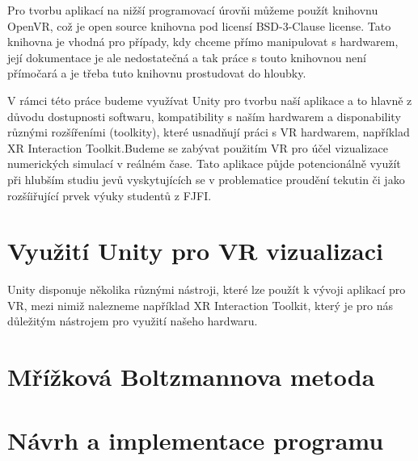 \documentclass[a4paper,oneside,12pt]{book}
\begin{document}
Pro tvorbu aplikací na nižší programovací úrovňi můžeme použít knihovnu OpenVR\cite{openvrdok}, což je open source knihovna pod licensí BSD-3-Clause license\cite{openvrdok}. Tato knihovna je vhodná pro případy, kdy chceme přímo manipulovat s hardwarem\cite{openvrdok}, její dokumentace je ale nedostatečná a tak práce s touto knihovnou není přímočará a je třeba tuto knihovnu prostudovat do hloubky.

V rámci této práce budeme využívat Unity pro tvorbu naší aplikace a to hlavně z důvodu dostupnosti softwaru, kompatibility s naším hardwarem\cite{unitypodpora} a disponability různými rozšířeními (toolkity), které usnadňují práci s VR hardwarem, například XR Interaction Toolkit\cite{unityxrinteract}.Budeme se zabývat použitím VR pro účel vizualizace numerických simulací v reálném čase. Tato aplikace půjde potencionálně využít při hlubším studiu jevů vyskytujících se v problematice proudění tekutin či jako rozšíiřující prvek výuky studentů z FJFI.



%

%


\chapter{Využití Unity pro VR vizualizaci}
Unity disponuje několika různými nástroji, které lze použít k vývoji aplikací pro VR, mezi nimiž nalezneme například XR Interaction Toolkit\cite{unityxrinteract}, který je pro nás důležitým nástrojem pro využití našeho hardwaru.

\chapter{Mřížková Boltzmannova metoda}

\chapter{Návrh a implementace programu}
\end{document}
